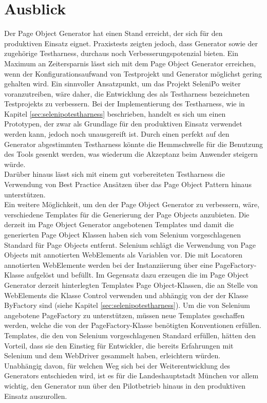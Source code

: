 \section{Ausblick}
\label{ausblick}
Der Page Object Generator hat einen Stand erreicht, der sich für den produktiven Einsatz eignet. Praxistests zeigten jedoch, dass Generator sowie der zugehörige Testharness, durchaus noch Verbesserungspotenzial bieten.
Ein Maximum an Zeitersparnis lässt sich mit dem Page Object Generator erreichen, wenn der Konfigurationsaufwand von Testprojekt und Generator möglichst gering gehalten wird.
Ein sinnvoller Ansatzpunkt, um das Projekt SeleniPo weiter voranzutreiben, wäre daher, die Entwicklung des als Testharness bezeichneten Testprojekts zu verbessern. Bei der Implementierung des Testharness, wie in Kapitel \ref{sec:selenipotestharness} beschrieben, handelt es sich um einen Prototypen, der zwar als Grundlage für den produktiven Einsatz verwendet werden kann, jedoch noch unausgereift ist. Durch einen perfekt auf den Generator abgestimmten Testharness könnte die Hemmschwelle für die Benutzung des Tools gesenkt werden, was wiederum die Akzeptanz beim Anwender steigern würde.\\
Darüber hinaus lässt sich mit einem gut vorbereiteten Testharness die Verwendung von Best Practice Ansätzen über das Page Object Pattern hinaus unterstützen.\\
Ein weitere Möglichkeit, um den der Page Object Generator zu verbessern, wäre, verschiedene Templates für die Generierung der Page Objects anzubieten.
Die derzeit im Page Object Generator angebotenen Templates und damit die generierten Page Object Klassen haben sich vom Selenium vorgeschlagenen Standard für Page Objects entfernt. Selenium schlägt die Verwendung von Page Objects mit annotierten WebElements als Variablen vor. Die mit Locatoren annotierten WebElemente werden bei der Instanziierung über eine PageFactory-Klasse aufgelöst und befüllt.
Im Gegensatz dazu erzeugen die im Page Object Generator derzeit hinterlegten Templates Page Object-Klassen, die an Stelle von WebElements die Klasse Control verwenden und abhängig von der der Klasse ByFactory sind (siehe Kapitel \ref{sec:selenipotestharness}). Um die von Selenium angebotene PageFactory zu unterstützen, müssen neue Templates geschaffen werden, welche die von der PageFactory-Klasse benötigten Konventionen erfüllen.
Templates, die den von Selenium vorgeschlagenen Standard erfüllen, hätten den Vorteil, dass sie den Einstieg für Entwickler, die bereits Erfahrungen mit Selenium und dem WebDriver gesammelt haben, erleichtern würden.\\
Unabhängig davon, für welchen Weg sich bei der Weiterentwicklung des Generators entschieden wird, ist es für die Landeshauptstadt München vor allem wichtig, den Generator nun über den Pilotbetrieb hinaus in den produktiven Einsatz auszurollen.













